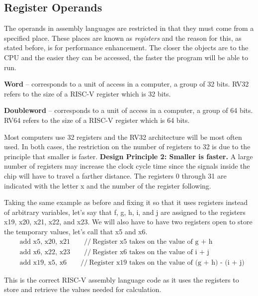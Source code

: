 \documentclass[12pt]{article}
\begin{document}
    \subsection*{Register Operands}
    \par The operands in assembly languages are restricted in that they must
    come from a specified place. These places are known as \textit{registers}
    and the reason for this, as stated before, is for performance enhancement.
    The closer the objects are to the CPU and the easier they can be accessed,
    the faster the program will be able to run.
    \par \textbf{Word} -- corresponds to a unit of access in a computer, a group
    of 32 bits. RV32 refers to the size of a RISC-V register which is 32 bits.
    \par \textbf{Doubleword} -- corresponds to a unit of access in a computer, a group
    of 64 bits. RV64 refers to the size of a RISC-V register which is 64 bits.
    \par Most computers use 32 registers and the RV32 architecture will be most
    often used. In both cases, the restriction on the number of registers to 32
    is due to the principle that smaller is faster. \textbf{Design Principle 2:
    Smaller is faster.} A large number of registers may increase the clock cycle
    time since the signals inside the chip will have to travel a farther
    distance. The registers 0 through 31 are indicated with the letter x and the
    number of the register following.
    \par Taking the same example as before and fixing it so that it uses
    registers instead of arbitrary variables, let's say that f, g, h, i, and j
    are assigned to the registers x19, x20, x21, x22, and x23. We will also have
    to have two registers open to store the temporary values, let's call that x5
    and x6.
    \begin{align*}
        & \text{add x5, x20, x21}\qquad //\ \text{Register x5 takes on the value of g + h}  \\
        & \text{add x6, x22, x23}\qquad //\ \text{Register x6 takes on the value of i + j}  \\
        & \text{add x19, x5, x6}\qquad //\ \text{Register x19 takes on the value of (g + h) - (i + j)}
    \end{align*}
    \par This is the correct RISC-V assembly language code as it uses the
    registers to store and retrieve the values needed for calculation.
\end{document}
